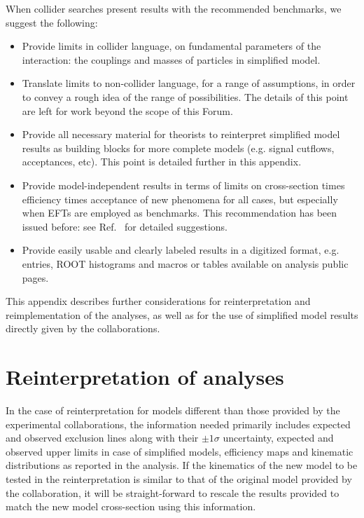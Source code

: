  When collider searches present results with the recommended benchmarks, we suggest the following:
 \begin{itemize}
 \item Provide limits in collider language, on fundamental parameters of
 the interaction: the couplings and masses of particles in simplified model.
 \item Translate limits to non-collider language, for a range of
 assumptions, in order to convey a rough idea of the range of
 possibilities. The details of this point are left for work beyond the scope of this Forum. 
 \item Provide all necessary material for theorists to reinterpret simplified
 model results as building blocks for more complete models (e.g. signal cutflows,
 acceptances, etc). This point is detailed further in this appendix.
\item Provide model-independent results in terms of limits on
  cross-section times efficiency times acceptance of new phenomena for all cases, but
  especially when EFTs are employed as benchmarks. This recommendation has been issued before: see
  Ref.~\cite{Kraml:2012sg} for detailed suggestions.
 \item Provide easily usable and clearly labeled results in a digitized format, e.g.~\cite{HEPData_doc} entries, ROOT histograms and macros
 or tables available on analysis public pages.
 \end{itemize}

This appendix describes further considerations for reinterpretation and reimplementation of the analyses, 
as well as for the use of simplified model results directly given by the collaborations. 

\section{Reinterpretation of analyses}

In the case of reinterpretation for models different than those provided by the experimental collaborations,
the information needed primarily includes expected and observed exclusion lines along with their $\pm 1 \sigma$ uncertainty, 
expected and observed upper limits in case of simplified models, efficiency maps and kinematic distributions
as reported in the analysis. If the kinematics of the new model to be tested in the reinterpretation is similar to that 
of the original model provided by the collaboration, it
will be straight-forward to rescale the results provided to match the new model cross-section
using this information. 


